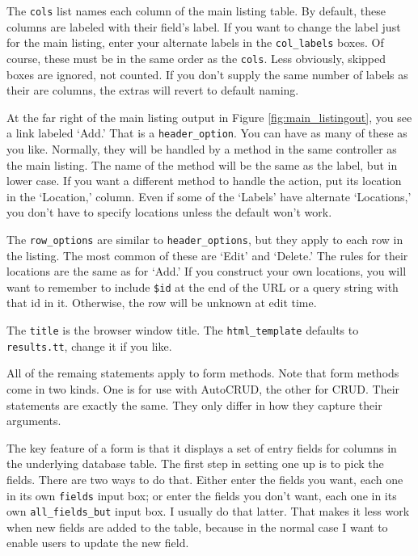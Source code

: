 The \verb+cols+ list names each column of the main listing table.  By
default, these columns are labeled with their field's label.  If you want
to change the label just for the main listing, enter your alternate
labels in the \verb+col_labels+ boxes.  Of course, these must be in the
same order as the \verb+cols+.  Less obviously, skipped boxes are ignored,
not counted.  If you don't supply the same number of labels as their
are columns, the extras will revert to default naming.

At the far right of the main listing output in Figure
\ref{fig:main_listingout}, you see a link labeled `Add.'  That is a
\verb+header_option+.  You can have as many of these as you like.
Normally, they will be handled by a method in the same controller as
the main listing.  The name of the method will be the same as the
label, but in lower case.  If you want a different method to handle
the action, put its location in the `Location,' column.  Even if
some of the `Labels' have alternate `Locations,' you don't have to
specify locations unless the default won't work.

The \verb+row_options+ are similar to \verb+header_options+, but they
apply to each row in the listing.  The most common of these are `Edit'
and `Delete.'  The rules for their locations are the same as for `Add.'
If you construct your own locations, you will want to remember to include
\verb+$id+ at the end of the URL or a query string with that id in it.
Otherwise, the row will be unknown at edit time.

The \verb+title+ is the browser window title.  The \verb+html_template+
defaults to \verb+results.tt+, change it if you like.

All of the remaing statements apply to form methods.  Note that form methods
come in two kinds.  One is for use with AutoCRUD, the other for CRUD.
Their statements are exactly the same.  They only differ in how they
capture their arguments.

The key feature of a form is that it displays a set of entry fields for
columns in the underlying database table.  The first step in setting
one up is to pick the fields.  There are two ways to do that.  Either
enter the fields you want, each one in its own \verb+fields+ input box;
or enter the fields you don't want, each one in its own \verb+all_fields_but+
input box.  I usually do that latter.  That makes it less work when
new fields are added to the table, because in the normal case I want to
enable users to update the new field.


